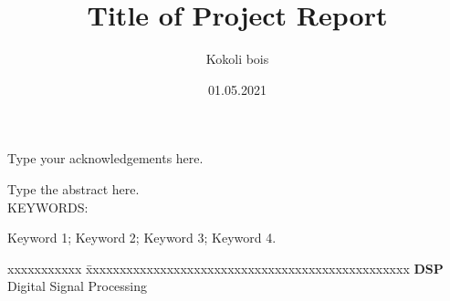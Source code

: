 \documentclass[BTech]{iiitdmdiss}
\begin{document}
\title{Title of Project Report}
\author{Kokoli bois}

\date{01.05.2021}

\maketitle

\declaration


\certificate
\acknowledgements

Type your acknowledgements here.

\abstract

Type the abstract here.
\\
\vspace{10pt}
\noindent KEYWORDS: \hspace*{0.5em} \parbox[t]{4.4in}{Keyword 1; Keyword 2; Keyword 3; Keyword 4.}


\pagebreak


\begin{singlespace}
\tableofcontents
\thispagestyle{empty}

\listoftables
{}
\listoffigures
{}
\end{singlespace}


\abbreviations

\noindent 
\begin{tabbing}
xxxxxxxxxxx \= xxxxxxxxxxxxxxxxxxxxxxxxxxxxxxxxxxxxxxxxxxxxxxxx \kill
\textbf{DSP}   \> Digital Signal Processing\\

\end{tabbing}
\end{document}
